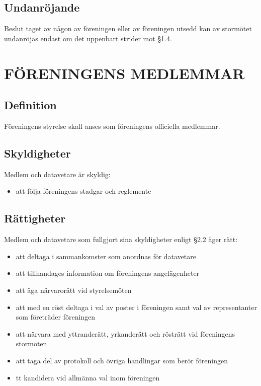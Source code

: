 \documentclass[a4paper]{article}
\begin{document}
{  \subsection{Undanröjande}
  Beslut taget av någon av föreningen eller av föreningen utsedd kan av stormötet undanröjas  endast om det uppenbart strider mot §1.4.
  \section{FÖRENINGENS MEDLEMMAR}
  {\subsection{Definition}
    Föreningens styrelse skall anses som föreningens officiella medlemmar.
    \subsection{Skyldigheter}
    Medlem och datavetare är skyldig:
    \begin{itemize}
    \item att följa föreningens stadgar och reglemente
    \end{itemize}
    \subsection{Rättigheter}
    Medlem och datavetare som fullgjort sina skyldigheter enligt \S2.2 äger rätt:
    \begin{itemize}
    \item att deltaga i sammankomster som anordnas för datavetare
    \item att tillhandages information om föreningens angelägenheter
    \item att äga närvarorätt vid styrelsemöten
    \item att med en röst deltaga i val av poster i föreningen samt val av representanter som företräder föreningen
    \item att närvara med yttranderätt, yrkanderätt och rösträtt vid föreningens stormöten
    \item att taga del av protokoll och övriga handlingar som berör föreningen
    \item tt kandidera vid allmänna val inom föreningen
    \end{itemize}
}}
\end{document}
